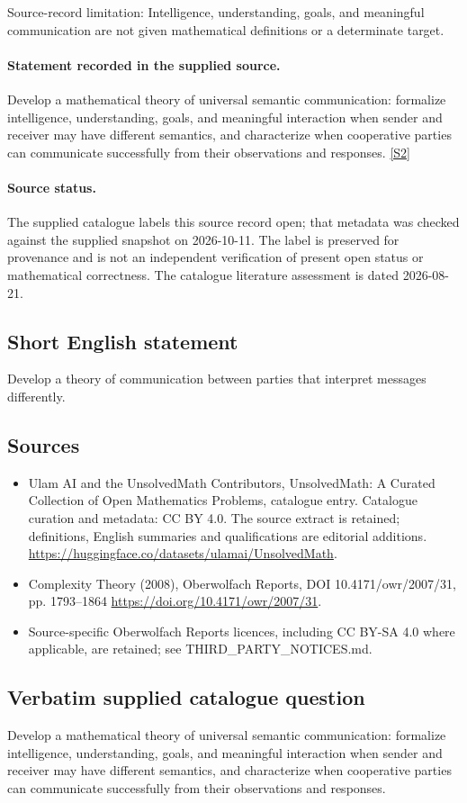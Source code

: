 \documentclass[11pt]{article}
\begin{document}
Source-record limitation: Intelligence, understanding, goals, and meaningful communication are not given mathematical definitions or a determinate target.
\paragraph{Statement recorded in the supplied source.}
Develop a mathematical theory of universal semantic communication: formalize intelligence, understanding, goals, and meaningful interaction when sender and receiver may have different semantics, and characterize when cooperative parties can communicate successfully from their observations and responses. \href{https://doi.org/10.4171/owr/2007/31}{[S2]}
\paragraph{Source status.}
The supplied catalogue labels this source record open; that metadata was checked against the supplied snapshot on 2026-10-11. The label is preserved for provenance and is not an independent verification of present open status or mathematical correctness. The catalogue literature assessment is dated 2026-08-21.
\subsection{Short English statement}
Develop a theory of communication between parties that interpret messages differently.
\subsection{Sources}
\begin{itemize}
\item[S1] Ulam AI and the UnsolvedMath Contributors, UnsolvedMath: A Curated Collection of Open Mathematics Problems, catalogue entry. Catalogue curation and metadata: CC BY 4.0. The source extract is retained; definitions, English summaries and qualifications are editorial additions.
\url{https://huggingface.co/datasets/ulamai/UnsolvedMath}.
\item[S2] Complexity Theory (2008), Oberwolfach Reports, DOI 10.4171/owr/2007/31, pp. 1793--1864
\url{https://doi.org/10.4171/owr/2007/31}.
\item Source-specific Oberwolfach Reports licences, including CC BY-SA 4.0 where applicable, are retained; see THIRD\_PARTY\_NOTICES.md.
\end{itemize}
\subsection{Verbatim supplied catalogue question}
Develop a mathematical theory of universal semantic communication: formalize intelligence, understanding, goals, and meaningful interaction when sender and receiver may have different semantics, and characterize when cooperative parties can communicate successfully from their observations and responses.
\end{document}
